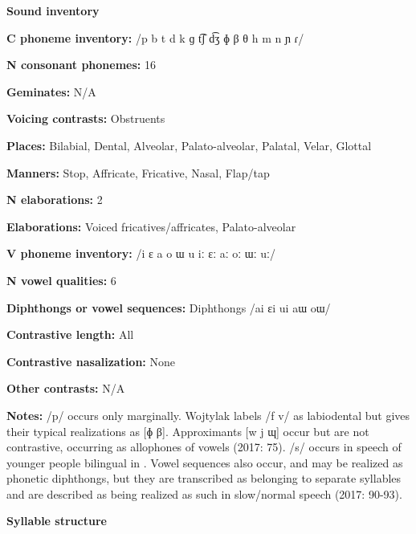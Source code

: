 \textbf{Sound inventory}



\textbf{C phoneme inventory:} /p b t d k ɡ t͡ʃ d͡ʒ ɸ β θ h m n ɲ ɾ/



\textbf{N consonant phonemes:} 16



\textbf{Geminates:} N/A



\textbf{Voicing contrasts:} Obstruents



\textbf{Places:} Bilabial, Dental, Alveolar, Palato-alveolar, Palatal, Velar, Glottal



\textbf{Manners:} Stop, Affricate, Fricative, Nasal, Flap/tap



\textbf{N elaborations:} 2



\textbf{Elaborations:} Voiced fricatives/affricates, Palato-alveolar



\textbf{V phoneme inventory:} /i ɛ a o ɯ u iː ɛː aː oː ɯː uː/



\textbf{N vowel qualities:} 6



\textbf{Diphthongs or vowel sequences:} Diphthongs /ai ɛi ui aɯ oɯ/



\textbf{Contrastive length:} All



\textbf{Contrastive nasalization:} None



\textbf{Other contrasts:} N/A



\textbf{Notes:} /p/ occurs only marginally. Wojtylak labels /f v/ as labiodental but gives their typical realizations as [ɸ β]. Approximants [w j ɰ] occur but are not contrastive, occurring as allophones of vowels (2017: 75). /s/ occurs in speech of younger people bilingual in . Vowel sequences also occur, and may be realized as phonetic diphthongs, but they are transcribed as belonging to separate syllables and are described as being realized as such in slow/normal speech (2017: 90-93).



\textbf{Syllable structure}



